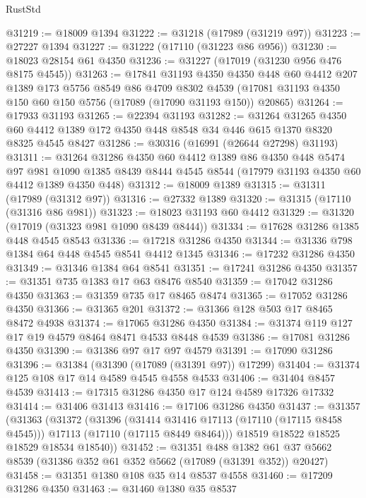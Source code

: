 \begin{lexlean}{RustStd}
\begin{coremodule}
@31219 := @18009 @1394
@31222 := @31218 (@17989 (@31219 @97))
@31223 := @27227 @1394
@31227 := @31222 (@17110 (@31223 @86 @956))
@31230 := @18023 @28154 @61 @4350
@31236 := @31227 (@17019 (@31230 @956 @476 @8175 @4545))
@31263 := @17841
    @31193
    @4350
    @4350
    @448
    @60
    @4412
    @207
    @1389
    @173
    @5756
    @8549
    @86
    @4709
    @8302
    @4539
    (@17081 @31193 @4350 @150 @60 @150 @5756 (@17089 (@17090 @31193 @150)) @20865)
@31264 := @17933 @31193
@31265 := @22394 @31193
@31282 := @31264
    @31265
    @4350
    @60
    @4412
    @1389
    @172
    @4350
    @448
    @8548
    @34
    @446
    @615
    @1370
    @8320
    @8325
    @4545
    @8427
@31286 := @30316 (@16991 (@26644 @27298) @31193)
@31311 := @31264
    @31286
    @4350
    @60
    @4412
    @1389
    @86
    @4350
    @448
    @5474
    @97
    @981
    @1090
    @1385
    @8439
    @8444
    @4545
    @8544
    (@17979 @31193 @4350 @60 @4412 @1389 @4350 @448)
@31312 := @18009 @1389
@31315 := @31311 (@17989 (@31312 @97))
@31316 := @27332 @1389
@31320 := @31315 (@17110 (@31316 @86 @981))
@31323 := @18023 @31193 @60 @4412
@31329 := @31320 (@17019 (@31323 @981 @1090 @8439 @8444))
@31334 := @17628 @31286 @1385 @448 @4545 @8543
@31336 := @17218 @31286 @4350
@31344 := @31336 @798 @1384 @64 @448 @4545 @8541 @4412 @1345
@31346 := @17232 @31286 @4350
@31349 := @31346 @1384 @64 @8541
@31351 := @17241 @31286 @4350
@31357 := @31351 @735 @1383 @17 @63 @8476 @8540
@31359 := @17042 @31286 @4350
@31363 := @31359 @735 @17 @8465 @8474
@31365 := @17052 @31286 @4350
@31366 := @31365 @201
@31372 := @31366 @128 @503 @17 @8465 @8472 @4938
@31374 := @17065 @31286 @4350
@31384 := @31374 @119 @127 @17 @19 @4579 @8464 @8471 @4533 @8448 @4539
@31386 := @17081 @31286 @4350
@31390 := @31386 @97 @17 @97 @4579
@31391 := @17090 @31286
@31396 := @31384 (@31390 (@17089 (@31391 @97)) @17299)
@31404 := @31374 @125 @108 @17 @14 @4589 @4545 @4558 @4533
@31406 := @31404 @8457 @4539
@31413 := @17315 @31286 @4350 @17 @124 @4589 @17326 @17332
@31414 := @31406 @31413
@31416 := @17106 @31286 @4350
@31437 := @31357
    (@31363
      (@31372
        (@31396
          (@31414 @31416 @17113 (@17110 (@17115 @8458 @4545)))
          @17113
          (@17110 (@17115 @8449 @8464)))
        @18519
        @18522
        @18525
        @18529
        @18534
        @18540))
@31452 := @31351
    @488
    @1382
    @61
    @37
    @5662
    @8539
    (@31386 @352 @61 @352 @5662 (@17089 (@31391 @352)) @20427)
@31458 := @31351 @1380 @108 @35 @14 @8537 @4558
@31460 := @17209 @31286 @4350
@31463 := @31460 @1380 @35 @8537

\end{coremodule}
\end{lexlean}
